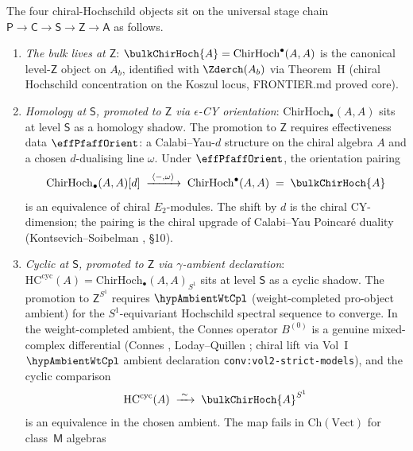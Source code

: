 \begin{theorem}
\label{thm:cyclic-hochschild-stage-stratification}%
%
%
The four chiral-Hochschild objects sit on the universal stage chain
$\mathsf{P} \to \mathsf{C} \to \mathsf{S} \to \mathsf{Z} \to \mathsf{A}$
as follows.
\begin{enumerate}[label=\textup{(\roman*)}]
\item \emph{The bulk lives at $\mathsf{Z}$}:
$\bulkChirHoch{A} = \mathrm{ChirHoch}^{\bullet}(A, A)$ is the
canonical level-$\mathsf{Z}$ object on $A_b$, identified with
$\Zderch(A_b)$ via Theorem~H (chiral Hochschild concentration on
the Koszul locus, FRONTIER.md proved core).
\item \emph{Homology at $\mathsf{S}$, promoted to $\mathsf{Z}$ via
$\epsilon$-CY orientation}:
$\mathrm{ChirHoch}_{\bullet}(A, A)$ sits at level $\mathsf{S}$ as a
homology shadow. The promotion to $\mathsf{Z}$ requires effectiveness
data $\effPfaffOrient$: a Calabi--Yau-$d$ structure on the chiral
algebra $A$ and a chosen $d$-dualising line $\omega$. Under
$\effPfaffOrient$, the orientation pairing
\[
\mathrm{ChirHoch}_{\bullet}(A, A)[d]
 \;\xrightarrow{\;\langle -, \omega\rangle\;}\;
 \mathrm{ChirHoch}^{\bullet}(A, A) \;=\; \bulkChirHoch{A}
\]
is an equivalence of chiral $E_2$-modules. The shift by $d$ is the
chiral CY-dimension; the pairing is the chiral upgrade of
Calabi--Yau Poincar\'e duality
\textup(Kontsevich--Soibelman \cite{KS09}, \S 10\textup).
\item \emph{Cyclic at $\mathsf{S}$, promoted to $\mathsf{Z}$ via
$\gamma$-ambient declaration}: $\mathrm{HC}^{\mathrm{cyc}}(A) =
\mathrm{ChirHoch}_{\bullet}(A, A)_{S^1}$ sits at level $\mathsf{S}$ as
a cyclic shadow. The promotion to $\mathsf{Z}^{S^1}$ requires
$\hypAmbientWtCpl$ (weight-completed pro-object ambient) for the
$S^1$-equivariant Hochschild spectral sequence to converge. In the
weight-completed ambient, the Connes operator $B^{(0)}$ is a genuine
mixed-complex differential (Connes \cite{Con85}, Loday--Quillen
\cite{LQ84}; chiral lift via Vol~I
$\hypAmbientWtCpl$ ambient declaration \texttt{conv:vol2-strict-models}),
and the cyclic comparison
\[
\mathrm{HC}^{\mathrm{cyc}}(A)
 \;\xrightarrow{\;\sim\;}\;
 \bulkChirHoch{A}^{S^1}
\]
is an equivalence in the chosen ambient. The map fails in
$\mathrm{Ch}(\mathrm{Vect})$ for class~$\mathsf{M}$ algebras

\end{enumerate}
\end{theorem}
